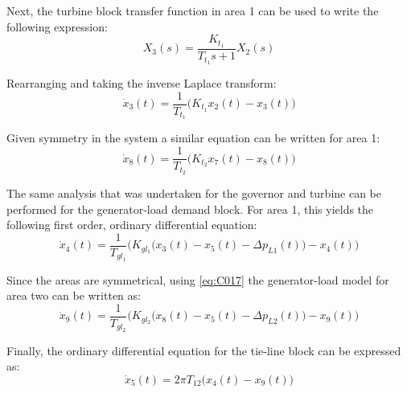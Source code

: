 Next, the turbine block transfer function in area 1 can be used to write the following expression:
\begin{equation}
	X_3(s) = \frac{K_{t_1}}{T_{t_1}s + 1} X_2(s) \label{eq:C014}
\end{equation}

Rearranging and taking the inverse Laplace transform:
\begin{equation}
	\dot{x}_3(t) = \frac{1}{T_{t_1}} \big( K_{t_1} x_2(t) - x_3(t) \big) \label{eq:C015}
\end{equation}

Given symmetry in the system a similar equation can be written for area 1:
\begin{equation}
	\dot{x}_8(t) = \frac{1}{T_{t_2}} \big( K_{t_2} x_7(t) - x_8(t) \big) \label{eq:C016}
\end{equation}

The same analysis that was undertaken for the governor and turbine can be performed for the generator-load demand block. For area 1, this yields the following first order, ordinary differential equation:
\begin{equation}
	\dot{x}_4(t) = \frac{1}{T_{gl_1}} \bigg( K_{gl_1} \big( x_3(t) - x_5(t) - \Delta p_{L1}(t) \big) - x_4(t) \bigg) \label{eq:C017}
\end{equation}

Since the areas are symmetrical, using \ref{eq:C017} the generator-load model for area two can be written as:
\begin{equation}
	\dot{x}_9(t) = \frac{1}{T_{gl_2}} \bigg( K_{gl_2} \big( x_8(t) - x_5(t) - \Delta p_{L2}(t) \big) - x_9(t) \bigg) \label{eq:C018}
\end{equation}

Finally, the ordinary differential equation for the tie-line block can be expressed as:
\begin{equation}
	\dot{x}_5(t) = 2 \pi T_{12} \big( x_4(t) - x_9(t) \big)
\end{equation}